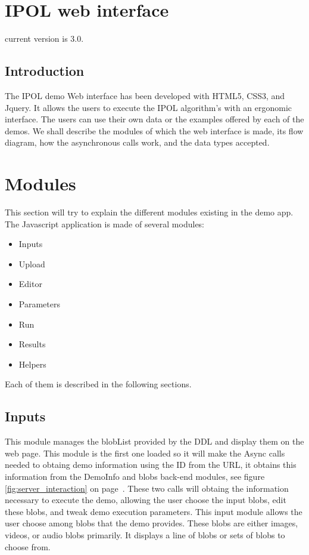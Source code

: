 \section{IPOL web interface}

current version is 3.0.

\subsection{Introduction}
The IPOL demo Web interface has been developed with HTML5, CSS3, and Jquery. 
It allows the users to execute the IPOL algorithm's with an ergonomic interface. The users can use their own data or the examples offered by each of the demos. We shall describe the modules of which the web interface is made, its flow diagram, how the asynchronous calls work, and the data types accepted.


\section{Modules}
This section will try to explain the different modules existing in the demo app. The Javascript application is made of several modules:

\begin{itemize}
	\item Inputs
	\item Upload
	\item Editor
	\item Parameters
	\item Run
	\item Results
	\item Helpers 
\end{itemize}

Each of them is described in the following sections.

\subsection{Inputs}
This module manages the blobList provided by the DDL and display them on the web page. This module is the first one loaded 
so it will make the Async calls needed to obtaing demo information using the ID from the URL, it obtains this information from 
the DemoInfo and blobs back-end modules, see figure \ref{fig:server_interaction} on page~\pageref{fig:server_interaction}. 
These two calls will obtaing the information necessary to execute the demo, allowing 
the user choose the input blobs, edit these blobs, and tweak demo execution parameters. This input module allows 
the user choose among blobs that the demo provides. These blobs are either images, videos, or audio blobs primarily. It displays 
a line of blobs or sets of blobs to choose from.



